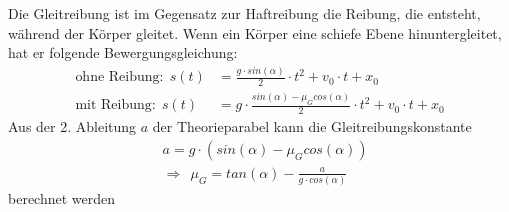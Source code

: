 \documentclass[11pt, a4paper]{article}
\begin{document}
    Die Gleitreibung ist im Gegensatz zur Haftreibung die Reibung, die entsteht, während der Körper gleitet.
    Wenn ein Körper eine schiefe Ebene hinuntergleitet, hat er folgende Bewergungsgleichung:
    \begin{align}
        \text{ohne Reibung:} \ \  s(t) &= \frac{g \cdot sin(\alpha)}{2} \cdot t^2 +v_0 \cdot t + x_0 \\
        \text{mit Reibung:} \ \  s(t) &= g \cdot \frac{sin(\alpha) -\mu_G cos(\alpha)}{2} \cdot t^2 +v_0 \cdot t + x_0
    \end{align}
    Aus der 2. Ableitung $a$ der Theorieparabel kann die Gleitreibungskonstante
    \begin{align}
        &a = g \cdot (sin(\alpha) - \mu_G cos(\alpha)) \\
        &\Rightarrow \ \ \mu_G = tan(\alpha) - \frac{a}{g \cdot cos(\alpha)}
    \end{align} 
    berechnet werden
\end{document}
